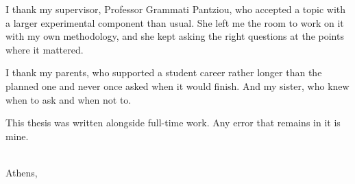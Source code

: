 %

I thank my supervisor, Professor Grammati Pantziou, who accepted a topic
with a larger experimental component than usual. She left me the room to
work on it with my own methodology, and she kept asking the right
questions at the points where it mattered.

I thank my parents, who supported a student career rather longer than
the planned one and never once asked when it would finish. And my
sister, who knew when to ask and when not to.

This thesis was written alongside full-time work. Any error that remains
in it is mine.

\vspace{2em}
\begin{flushright}
\thAuthorEN\\
Athens, \the\year
\end{flushright}
